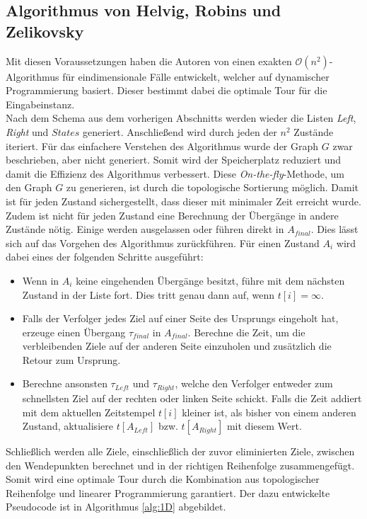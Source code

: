 \documentclass[german,version-2019-11]{uzl-thesis}
\begin{document}
\subsection{Algorithmus von Helvig, Robins und Zelikovsky}

Mit diesen Voraussetzungen haben die Autoren von \cite{helvig} einen exakten $\mathcal{O}(n^2)$-Algorithmus für eindimensionale Fälle entwickelt, welcher auf dynamischer Programmierung basiert. Dieser bestimmt dabei die optimale Tour für die Eingabeinstanz. \\
Nach dem Schema aus dem vorherigen Abschnitts werden wieder die Listen \emph{Left}, \emph{Right} und $States$ generiert. Anschließend wird durch jeden der $n^2$ Zustände iteriert. Für das einfachere Verstehen des Algorithmus wurde der Graph $G$ zwar beschrieben, aber nicht generiert. Somit wird der Speicherplatz reduziert und damit die Effizienz des Algorithmus verbessert. Diese \emph{On-the-fly}-Methode, um den Graph $G$ zu generieren, ist durch die topologische Sortierung möglich. Damit ist für jeden Zustand sichergestellt, dass dieser mit minimaler Zeit erreicht wurde. Zudem ist nicht für jeden Zustand eine Berechnung der Übergänge in andere Zustände nötig. Einige werden ausgelassen oder führen direkt in $A_{final}$. Dies lässt sich auf das Vorgehen des Algorithmus zurückführen. Für einen Zustand $A_i$ wird dabei eines der folgenden Schritte ausgeführt:
\begin{itemize}
\item Wenn in $A_i$ keine eingehenden Übergänge besitzt, führe mit dem nächsten Zustand in der Liste fort. Dies tritt genau dann auf, wenn $t[i] = \infty$.
\item Falls der Verfolger jedes Ziel auf einer Seite des Ursprungs eingeholt hat, erzeuge einen Übergang $\tau_{final}$ in $A_{final}$. Berechne die Zeit, um die verbleibenden Ziele auf der anderen Seite einzuholen und zusätzlich die Retour zum Ursprung. 
\item Berechne ansonsten $\tau_{Left}$ und $\tau_{Right}$, welche den Verfolger entweder zum schnellsten Ziel auf der rechten oder linken Seite schickt. Falls die Zeit addiert mit dem aktuellen Zeitstempel $t[i]$ kleiner ist, als bisher von einem anderen Zustand, aktualisiere $t[A_{Left}]$ bzw. $t[A_{Right}]$ mit diesem Wert.
\end{itemize}
Schließlich werden alle Ziele, einschließlich der zuvor eliminierten Ziele, zwischen den Wendepunkten berechnet und in der richtigen Reihenfolge zusammengefügt. Somit wird eine optimale Tour durch die Kombination aus topologischer Reihenfolge und linearer Programmierung garantiert. Der dazu entwickelte Pseudocode ist in Algorithmus \ref{alg:1D} abgebildet\cite{helvig}. 
\end{document}
